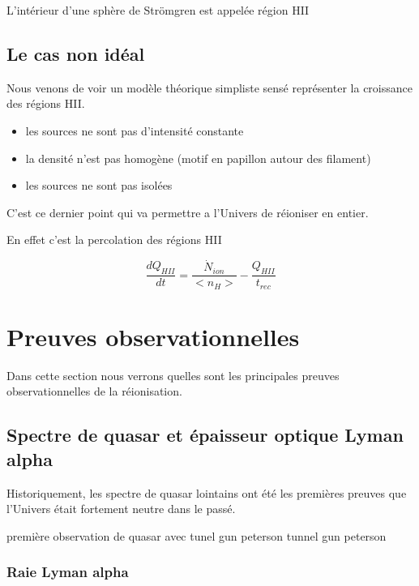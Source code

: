 L'intérieur d'une sphère de Strömgren est appelée région HII


\subsection{Le cas non idéal}
Nous venons de voir un modèle théorique simpliste sensé représenter la croissance des régions HII.

\begin{itemize}
\item les sources ne sont pas d'intensité constante
\item la densité n'est pas homogène (motif en papillon autour des filament)
\item les sources ne sont pas isolées
\end{itemize}

C'est ce dernier point qui va permettre a l'Univers de réioniser en entier.

En effet c'est la percolation des régions HII


\begin{equation}
\frac{dQ_{HII}}{dt} = \frac{\dot{N}_{ion}}{ <n_H>} - \frac{Q_{HII}}{t_{rec}}
\end{equation}


\section{Preuves observationnelles}
Dans cette section nous verrons quelles sont les principales preuves observationnelles de la réionisation.

\subsection{Spectre de quasar et épaisseur optique Lyman alpha}

Historiquement, les spectre de quasar lointains ont été les premières preuves que l'Univers était fortement neutre dans le passé.

première observation de quasar avec tunel gun peterson \cite{1965ApJ...141.1295S}
tunnel gun peterson \cite{1965ApJ...142.1633G} 

\subsubsection{Raie Lyman alpha}

